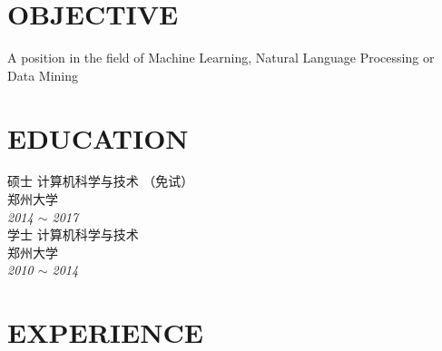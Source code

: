 \documentclass[line, margin]{res}
\begin{document}
\address{likun@stu.zzu.edu.cn}
\address{152-2511-1797}

\begin{resume}
\vspace {5pt}
\section{OBJECTIVE}
A position in the field of Machine Learning, Natural Language Processing or Data Mining

\section{EDUCATION} 
 { 硕士 计算机科学与技术 （免试）  \\
 郑州大学 }\\
 {\sl 2014 $\sim$ 2017} \\
[15pt]
 { 学士 计算机科学与技术 \\
 郑州大学 } \\
 {\sl 2010 $\sim$ 2014 }
 
\section{EXPERIENCE}


\end{resume}
\end{document}
